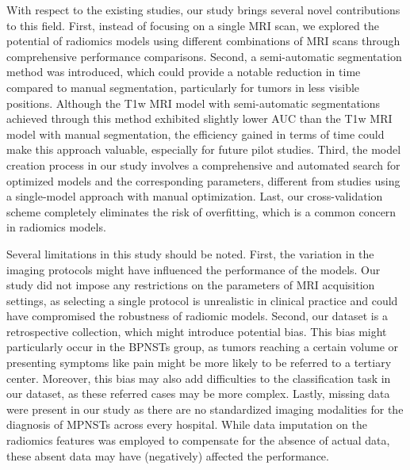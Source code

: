With respect to the existing studies, our study brings several novel contributions to this field.
First, instead of focusing on a single MRI scan, we explored the potential of radiomics models using different combinations of MRI scans through comprehensive performance comparisons.
Second, a semi-automatic segmentation method was introduced, which could provide a notable reduction in time compared to manual segmentation, particularly for tumors in less visible positions.
Although the T1w MRI model with semi-automatic segmentations achieved through this method exhibited slightly lower AUC than the T1w MRI model with manual segmentation, the efficiency gained in terms of time could make this approach valuable, especially for future pilot studies.
Third, the model creation process in our study involves a comprehensive and automated search for optimized models and the corresponding parameters, different from studies using a single-model approach with manual optimization.
Last, our cross-validation scheme completely eliminates the risk of overfitting, which is a common concern in radiomics models.

Several limitations in this study should be noted.
First, the variation in the imaging protocols might have influenced the performance of the models.
Our study did not impose any restrictions on the parameters of MRI acquisition settings, as selecting a single protocol is unrealistic in clinical practice and could have compromised the robustness of radiomic models.
Second, our dataset is a retrospective collection, which might introduce potential bias.
This bias might particularly occur in the BPNSTs group, as tumors reaching a certain volume or presenting symptoms like pain might be more likely to be referred to a tertiary center.
Moreover, this bias may also add difficulties to the classification task in our dataset, as these referred cases may be more complex.
Lastly, missing data were present in our study as there are no standardized imaging modalities for the diagnosis of MPNSTs across every hospital.
While data imputation on the radiomics features was employed to compensate for the absence of actual data, these absent data may have (negatively) affected the performance.

